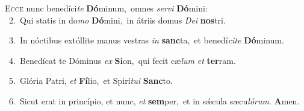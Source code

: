 \lettrine{\initial\textcolor{\initialcolor}{E}}{cce} nunc benedíci\textit{te} \textbf{Dó}\-minum,~\star omnes \textit{ser}\-\textit{vi} \textbf{Dó}\-mini:\\
{\numbfont\textcolor{\numbcolor}{~2.}}~Qui statis in do\textit{mo} \textbf{Dó}\-mini,~\star in átriis domus \textit{De}\-\textit{i} \textbf{nos}\-tri.\par
{\numbfont\textcolor{\numbcolor}{~3.}}~In nóctibus extóllite manus vestras \textit{in} \textbf{sanc}\-ta,~\star et benedí\-\textit{ci}\-\textit{te} \textbf{Dó}\-minum.\par
{\numbfont\textcolor{\numbcolor}{~4.}}~Benedícat te Dóminus \textit{ex} \textbf{Si}\-on,~\star qui fecit cæ\textit{lum} \textit{et} \textbf{ter}\-ram.\par
{\numbfont\textcolor{\numbcolor}{~5.}}~Glória Patri, \textit{et} \textbf{Fí}\-lio,~\star et Spirí\-\textit{tu}\-\textit{i} \textbf{Sanc}\-to.\par
{\numbfont\textcolor{\numbcolor}{~6.}}~Sicut erat in princípio, et nunc, \textit{et} \textbf{sem}\-per,~\star et in sǽcula sæcu\-\textit{ló}\-\textit{rum}. \textbf{A}\-men.\par
